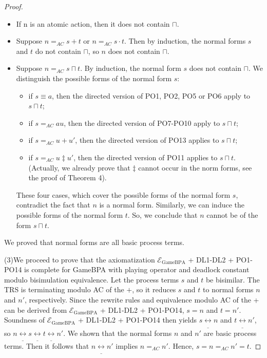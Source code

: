 \documentclass{fac}
\begin{document}
\begin{proof}
\begin{itemize}
  \item If n is an atomic action, then it does not contain $\sqcap$.
  \item Suppose $n =_{AC} s + t$ or $n =_{AC} s \cdot t$. Then by induction, the normal forms $s$ and $t$ do not contain $\sqcap$, so $n$ does not contain $\sqcap$.
  \item Suppose $n =_{AC} s\sqcap t$. By induction, the normal form $s$ does not contain $\sqcap$. We distinguish the possible forms of the normal form $s$:
  \begin{itemize}
    \item if $s \equiv a$, then the directed version of PO1, PO2, PO5 or PO6 apply to $s \sqcap t$;
    \item if $s =_{AC} au$, then the directed version of PO7-PO10 apply to $s\sqcap t$;
    \item if $s =_{AC} u + u'$, then the directed version of PO13 applies to $s \sqcap t$;
    \item if $s =_{AC} u \ddagger u'$, then the directed version of PO11 applies to $s \sqcap t$. (Actually, we already prove that $\ddagger$ cannot occur in the norm forms, see the proof of Theorem 4).
  \end{itemize}
   These four cases, which cover the possible forms of the normal form $s$, contradict the fact that $n$ is a normal form. Similarly, we can induce the possible forms of the normal form $t$. So, we conclude that $n$ cannot be of the form $s\sqcap t$.
\end{itemize}

We proved that normal forms are all basic process terms.

(3)We proceed to prove that the axiomatization $\mathcal{E}_{\textrm{GameBPA}}$ + DL1-DL2 + PO1-PO14 is complete for GameBPA with playing operator and deadlock constant modulo bisimulation equivalence. Let the process terms $s$ and $t$ be bisimilar. The TRS is terminating modulo AC of the $+$, so it reduces $s$ and $t$ to normal forms $n$ and $n'$, respectively. Since the rewrite rules and equivalence modulo AC of the + can be derived from $\mathcal{E}_{\textrm{GameBPA}}$ + DL1-DL2 + PO1-PO14, $s = n$ and $t = n'$. Soundness of $\mathcal{E}_{\textrm{GameBPA}}$ + DL1-DL2 + PO1-PO14 then yields $s\underline{\leftrightarrow} n$ and $t \underline{\leftrightarrow} n'$, so $n\underline{\leftrightarrow} s \underline{\leftrightarrow} t \underline{\leftrightarrow} n'$. We shown that the normal forms $n$ and $n'$ are basic process terms. Then it follows that $n\underline{\leftrightarrow} n'$ implies $n =_{AC} n'$. Hence, $s = n =_{AC} n' = t$.
\end{proof}
\end{document}
